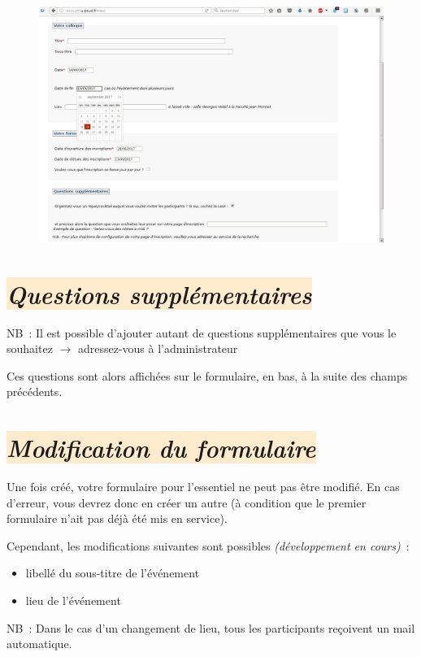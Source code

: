 \documentclass[10pt,a4paper]{article}
\newcommand{\rosepale}[1]{\colorbox{BlanchedAlmond}{#1}}
\begin{document}
\begin{figure}[h]
  \includegraphics[width=500px]{images/creation-formulaire}
\end{figure}

\section*{\rosepale{\emph{Questions supplémentaires}}}

NB : Il est possible d'ajouter autant de questions supplémentaires que vous le souhaitez $\longrightarrow$ adressez-vous à l'administrateur

Ces questions sont alors affichées sur le formulaire, en bas, à la suite des champs précédents.

\newpage
\section*{\rosepale{\emph{Modification du formulaire}}}

Une fois créé, votre formulaire pour l'essentiel ne peut pas être modifié. En
cas d'erreur, vous devrez donc en créer un autre (à condition que le premier
formulaire n'ait pas déjà été mis en service).

Cependant, les modifications suivantes sont possibles \emph{(développement en cours)} :
\begin{itemize}
  \item libellé du sous-titre de l'événement
  \item lieu de l'événement
\end{itemize}

NB : Dans le cas d'un changement de lieu, tous les participants reçoivent un mail automatique.
\end{document}
